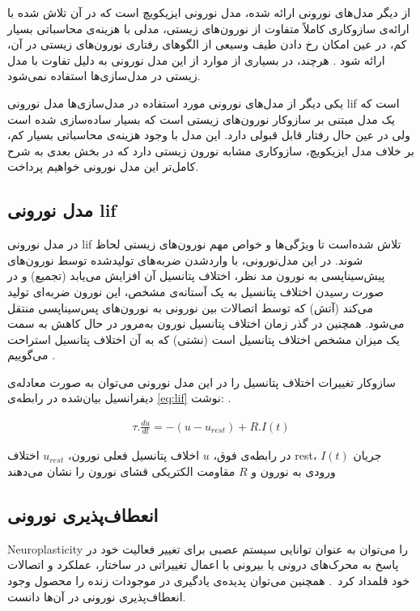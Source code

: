 \documentclass[12pt]{report}
\begin{document}
	از دیگر مدل‌های نورونی ارائه شده، مدل نورونی ایزیکویچ است که در آن تلاش شده با ارائه‌ی ساز‌وکاری کاملاً متفاوت از نورون‌های زیستی، مدلی با هزینه‌ی محاسباتی بسیار کم، در عین امکان رخ دادن طیف وسیعی از الگو‌های رفتاری نورون‌های زیستی در آن، ارائه شود \cite{1257420}. هرچند، در بسیاری از موارد از این مدل نورونی به دلیل تفاوت با مدل زیستی در مدل‌سازی‌ها استفاده نمی‌شود.
	
	یکی دیگر از مدل‌های نورونی مورد استفاده در مدل‌سازی‌ها مدل نورونی 
	\gls{lif}
	است که یک مدل مبتنی بر سازوکار نورون‌های زیستی است که بسیار ساده‌سازی شده است ولی در عین حال رفتار قابل قبولی دارد. این مدل با وجود هزینه‌ی محاسباتی بسیار کم، بر خلاف مدل ایزیکویچ، سازوکاری مشابه نورون زیستی دارد که در بخش بعدی به شرح کامل‌تر این مدل نورونی خواهیم پرداخت.
	
	\subsection{مدل نورونی \gls{lif}}
	در مدل نورونی \gls{lif} تلاش شده‌است تا ویژگی‌ها و خواص مهم نورون‌های زیستی لحاظ شوند. در این مدل‌نورونی، با وارد‌شدن ضربه‌های تولیدشده توسط نورون‌های پیش‌سیناپسی به نورون مد ‌نظر، اختلاف پتانسیل آن افزایش می‌یابد (تجمیع) و در صورت رسیدن اختلاف پتانسیل به یک آستانه‌ی مشخص، این نورون ضربه‌ای تولید می‌کند (آتش) که توسط اتصالات بین نورونی به نورون‌های پس‌سیناپسی منتقل می‌شود. همچنین در گذر زمان اختلاف پتانسیل نورون به‌مرور در حال کاهش به سمت یک میزان مشخص اختلاف پتانسیل است (نشتی) که به آن اختلاف پتانسیل استراحت می‌گوییم
	\cite{gerstner2014neuronal}.
	
	ساز‌وکار تغییرات اختلاف پتانسیل را در این مدل نورونی می‌توان به صورت معادله‌ی دیفرانسیل بیان‌شده در رابطه‌ی \ref{eq:lif} نوشت:
	\cite{gerstner2014neuronal}.
	
	\begin{align}
		\tau . \frac{du}{dt} = -(u - u_{rest}) + R . I(t) 
		\label{eq:lif}
	\end{align}

 در رابطه‌ی فوق، $u$ اخلاف پتانسیل فعلی نورون، $u_{rest}$ اختلاف \gls{rest}، $I(t)$ جریان ورودی به نورون و $R$ مقاومت الکتریکی قشای نورون را نشان می‌دهند


\subsection{انعطاف‌پذیری نورونی}

\gls{Neuroplasticity} را می‌توان به عنوان توانایی سیستم عصبی برای تغییر فعالیت خود در پاسخ به محرک‌های درونی یا بیرونی با اعمال تغییراتی در ساختار، عملکرد و اتصالات خود قلمداد کرد~\cite{MateosAparicio2019}.
همچنین می‌توان پدیده‌ی یادگیری در موجودات زنده را محصول وجود انعطاف‌پذیری نورونی در آن‌ها دانست.
\end{document}
